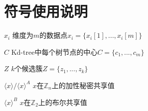 \chapter*{符号使用说明}

\begin{denotation}
%	
%
%	
\item[$ x_i $ ] 维度为$ m $的数据点$ x_i =\{x_{i}[1],...,x_{i}[m]\}  $
\item[$ C $ ] Kd-tree中每个树节点的中心$ C = \{c_1,...,c_m\}  $
\item[$ Z $ ] $ k $个候选簇$ Z = \{z_1,...,z_k\} $
\item[$ \langle x \rangle/\langle x \rangle^A $] $ x $在$ \mathbb{Z}_n $上的加性秘密共享值
\item[$ \langle x \rangle^B $ ] $ x $在$ \mathbb{Z}_2 $上的布尔共享值

\end{denotation}
